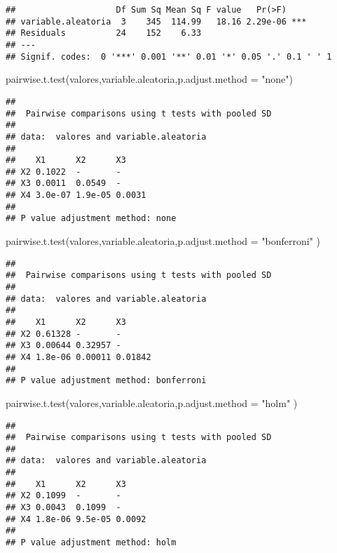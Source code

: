 \documentclass[
]{article}
\newenvironment{Shaded}{\begin{snugshade}}{\end{snugshade}}
\newcommand{\AttributeTok}[1]{\textcolor[rgb]{0.77,0.63,0.00}{#1}}
\newcommand{\FunctionTok}[1]{\textcolor[rgb]{0.00,0.00,0.00}{#1}}
\newcommand{\NormalTok}[1]{#1}
\newcommand{\StringTok}[1]{\textcolor[rgb]{0.31,0.60,0.02}{#1}}
\begin{document}
\begin{verbatim}
##                    Df Sum Sq Mean Sq F value   Pr(>F)    
## variable.aleatoria  3    345  114.99   18.16 2.29e-06 ***
## Residuals          24    152    6.33                     
## ---
## Signif. codes:  0 '***' 0.001 '**' 0.01 '*' 0.05 '.' 0.1 ' ' 1
\end{verbatim}

\begin{Shaded}
\begin{Highlighting}[]
\FunctionTok{pairwise.t.test}\NormalTok{(valores,variable.aleatoria,}\AttributeTok{p.adjust.method =} \StringTok{"none"}\NormalTok{)}
\end{Highlighting}
\end{Shaded}

\begin{verbatim}
## 
##  Pairwise comparisons using t tests with pooled SD 
## 
## data:  valores and variable.aleatoria 
## 
##    X1      X2      X3    
## X2 0.1022  -       -     
## X3 0.0011  0.0549  -     
## X4 3.0e-07 1.9e-05 0.0031
## 
## P value adjustment method: none
\end{verbatim}

\begin{Shaded}
\begin{Highlighting}[]
\FunctionTok{pairwise.t.test}\NormalTok{(valores,variable.aleatoria,}\AttributeTok{p.adjust.method =} \StringTok{"bonferroni"}\NormalTok{ )}
\end{Highlighting}
\end{Shaded}

\begin{verbatim}
## 
##  Pairwise comparisons using t tests with pooled SD 
## 
## data:  valores and variable.aleatoria 
## 
##    X1      X2      X3     
## X2 0.61328 -       -      
## X3 0.00644 0.32957 -      
## X4 1.8e-06 0.00011 0.01842
## 
## P value adjustment method: bonferroni
\end{verbatim}

\begin{Shaded}
\begin{Highlighting}[]
\FunctionTok{pairwise.t.test}\NormalTok{(valores,variable.aleatoria,}\AttributeTok{p.adjust.method =} \StringTok{"holm"}\NormalTok{ )}
\end{Highlighting}
\end{Shaded}

\begin{verbatim}
## 
##  Pairwise comparisons using t tests with pooled SD 
## 
## data:  valores and variable.aleatoria 
## 
##    X1      X2      X3    
## X2 0.1099  -       -     
## X3 0.0043  0.1099  -     
## X4 1.8e-06 9.5e-05 0.0092
## 
## P value adjustment method: holm
\end{verbatim}
\end{document}
